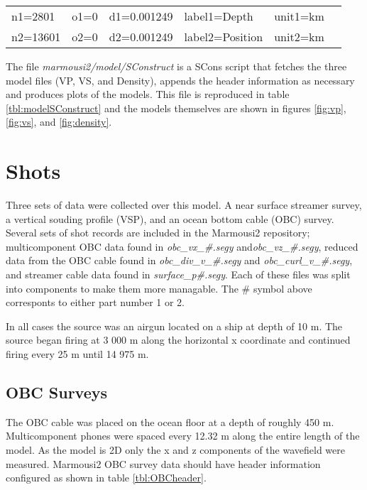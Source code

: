 {
\begin{center}
\begin{tabular}[t]{|llllll|}
        \hline
        n1=2801    &   o1=0 &   d1=0.001249    &    label1=Depth     &  unit1=km &  \\
        n2=13601   &   o2=0 &   d2=0.001249    &    label2=Position  &  unit2=km &  \\
        \hline
\end{tabular}
\end{center}
}


The file \emph{marmousi2\slash model\slash SConstruct} is a SCons script that fetches the three model files (VP, VS, and Density), 
appends the header information as necessary and produces plots of the models.  This file is reproduced in table 
\ref{tbl:modelSConstruct} and the models themselves are shown in figures \ref{fig:vp}, \ref{fig:vs}, and \ref{fig:density}.   

{
\tiny

\normalsize
}


\section{Shots}
Three sets of data were collected over this model.  A near surface streamer survey, a vertical souding profile (VSP), and 
an ocean bottom cable (OBC) survey.  Several sets of shot records are included in the Marmousi2 repository; 
multicomponent OBC data found in \emph{obc\_vx\_\#.segy} and\emph{obc\_vz\_\#.segy},  
reduced data from the OBC cable found in \emph{obc\_div\_v\_\#.segy} and \emph{obc\_curl\_v\_\#.segy}, and
streamer cable data found in \emph{surface\_p\#.segy}.  Each of these files was split into components to make them more 
managable.  The  \# symbol above corresponts to either part number 1 or 2. 

In all cases the source was an airgun located on a ship at depth of 10 m.  The source began firing at 3 000 m along the horizontal x 
coordinate and continued firing every 25 m until 14 975 m.  

\subsection{OBC Surveys}
The OBC cable was placed on the ocean floor at a depth of roughly 450 m.  Multicomponent phones were spaced every 12.32 m along the
entire length of the model.  As the model is 2D only the x and z components of the wavefield were measured.  
Marmousi2 OBC survey data should have header information configured as shown in table \ref{tbl:OBCheader}.

